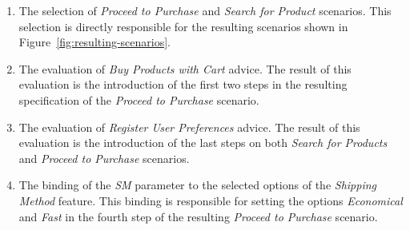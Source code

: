 \begin{enumerate} 
 \item The selection of \emph{Proceed to Purchase} and \emph{Search for Product} scenarios. This selection is directly responsible 
for the resulting scenarios shown in Figure~\ref{fig:resulting-scenarios}. 
  
 \item The evaluation of \emph{Buy Products with Cart} advice. The result of this evaluation is the introduction of the 
first two steps in the resulting specification of the \emph{Proceed to Purchase} scenario. 
 
 \item The evaluation of \emph{Register User Preferences} advice. The result of this evaluation is the introduction of the last steps on both \emph{Search for Products} and \emph{Proceed to
Purchase} scenarios.

 \item The binding of the \emph{SM} parameter to the selected options of the \emph{Shipping Method} feature. This binding is responsible for 
 setting the options \emph{Economical} and \emph{Fast} in the fourth step of the
 resulting \emph{Proceed to Purchase} scenario.

\end{enumerate}

